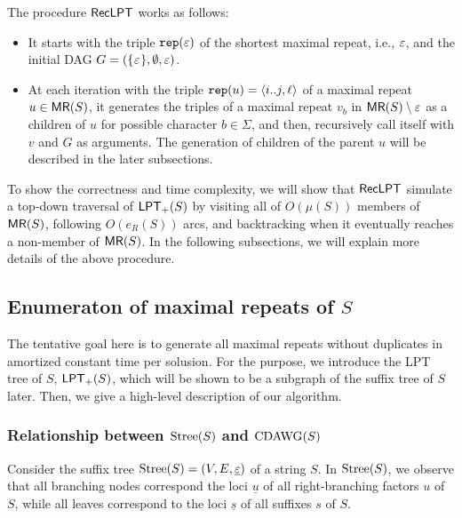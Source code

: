 \documentclass{article}
\begin{document}
The procedure $\textsf{RecLPT}$ works as follows: 
\begin{itemize}
\item It starts with the triple $\mathtt{rep}(\varepsilon)$ of the shortest maximal repeat, i.e., $\varepsilon$, and the initial DAG $G = (\{\kern0.05em\varepsilon\kern0.05em\}, \emptyset{}, \varepsilon)$. 
  
\item At each iteration with the triple $\mathtt{rep}(u) = \langle i..j, \ell\rangle$ of a maximal repeat $u \in \textsf{MR}(S)$, it generates the triples of a maximal repeat $v_b$ in $\textsf{MR}(S)\setminus{\varepsilon}$ as a children of $u$ for possible character $b\in\Sigma$, and then, recursively call itself with $v$ and $G$ as arguments. The generation of children of the parent $u$ will be described in the later subsections. 
\end{itemize}

To show the correctness and time complexity, we will show that $\textsf{RecLPT}$ simulate a top-down traversal of $\mathsf{LPT}_{+}(S)$ by visiting all of $O(\mu(S))$ members of $\textsf{MR}(S)$, following $O(e_R(S))$ arcs, and backtracking when it eventually reaches a non-member of $\textsf{MR}(S)$.
In the following subsections, we will explain more details of the above procedure. 


\subsection{Enumeraton of maximal repeats of $S$}  
The tentative goal here is to generate all maximal repeats without duplicates in amortized constant time per solusion. For the purpose, we introduce the LPT tree of $S$, $\mathsf{LPT}_{+}(S)$, which will be shown to be a subgraph of the suffix tree of $S$ later. Then, we give a high-level description of our algorithm.

\subsubsection{Relationship between $\mathrm{Stree}(S)$ and $\mathrm{CDAWG}(S)$}
Consider the suffix tree $\mathrm{Stree}(S) = (V, E, \underline{\varepsilon})$ of a string $S$. 
In $\mathrm{Stree}(S)$, we observe that all branching nodes correspond the loci $\underline u$ of all right-branching factors $u$ of $S$, while all leaves correspond to the loci $\underline s$ of all suffixes $s$ of $S$.
\end{document}
